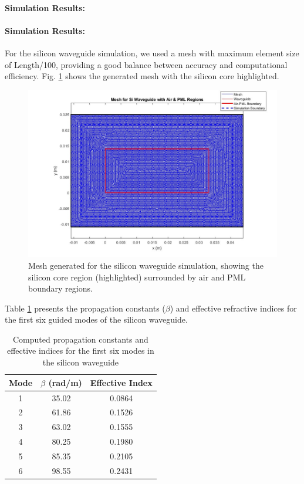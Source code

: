 \documentclass[10pt,letterpaper]{article}
\begin{document}
\paragraph{Simulation Results:} 
\paragraph{Simulation Results:} 
For the silicon waveguide simulation, we used a mesh with maximum element size of Length/100, providing a good balance between accuracy and computational efficiency. Fig. \ref{fig:si_mesh} shows the generated mesh with the silicon core highlighted.

\begin{figure}[htbp]
    \centering
    \includegraphics[width=0.8\linewidth]{4.jpg}
    \caption{Mesh generated for the silicon waveguide simulation, showing the silicon core region (highlighted) surrounded by air and PML boundary regions.}
    \label{fig:si_mesh}
\end{figure}

Table \ref{tab:si_results} presents the propagation constants ($\beta$) and effective refractive indices for the first six guided modes of the silicon waveguide.

\begin{table}[htbp]
    \centering
    \caption{Computed propagation constants and effective indices for the first six modes in the silicon waveguide}
    \begin{tabular}{ccc}
    \hline
    Mode & $\beta$ (rad/m) & Effective Index \\
    \hline
     1   &      35.02      &      0.0864     \\
     2   &      61.86      &      0.1526     \\
     3   &      63.02      &      0.1555     \\
     4   &      80.25      &      0.1980     \\
     5   &      85.35      &      0.2105     \\
     6   &      98.55      &      0.2431     \\
    \hline
    \end{tabular}
    \label{tab:si_results}
\end{table}
\end{document}

